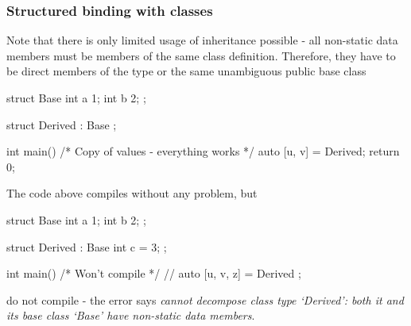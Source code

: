 \documentclass[../main]{subfiles}
\begin{document}
\subsubsection{Structured binding with classes}
    Note that there is only limited usage of inheritance possible - all non-static data members must be members of the same class definition. Therefore, they have to be direct members of the type or
the same unambiguous public base class
\begin{Code}
    struct Base
    {
        int a {1};
        int b {2};
    };

    struct Derived : Base {};

    int main()
    {
        /* Copy of values - everything works */
        auto [u, v] = Derived{};
        return 0;
    }
\end{Code}
\noindent
The code above compiles without any problem, but
\begin{Code}
    struct Base
    {
        int a {1};
        int b {2};
    };

    struct Derived : Base
    {
        int c = {3};
    };

    int main()
    {
        /* Won't compile */
        // auto [u, v, z] = Derived {};
    }
\end{Code}
do not compile - the error says \textit {cannot decompose class type ‘Derived’: both it and its base class ‘Base’ have non-static data members}.\newline
\end{document}
